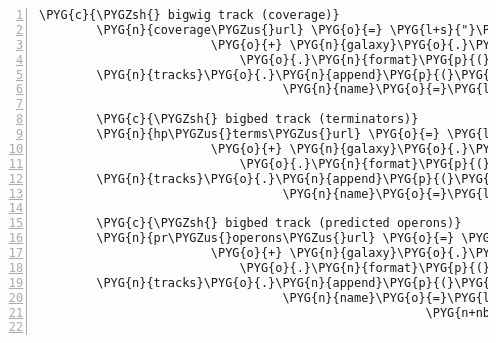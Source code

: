\begin{Verbatim}[commandchars=\\\{\},numbers=left,firstnumber=1,stepnumber=5]
        \PYG{c}{\PYGZsh{} bigwig track (coverage)}
        \PYG{n}{coverage\PYGZus{}url} \PYG{o}{=} \PYG{l+s}{"}\PYG{l+s}{https://}\PYG{l+s}{"} \PYG{o}{+} \PYG{n}{galaxy}\PYG{o}{.}\PYG{n}{hostname} \PYGZbs{}
                        \PYG{o}{+} \PYG{n}{galaxy}\PYG{o}{.}\PYG{n}{dataset\PYGZus{}display\PYGZus{}url\PYGZus{}template} \PYGZbs{}
                            \PYG{o}{.}\PYG{n}{format}\PYG{p}{(}\PYG{n}{dataset}\PYG{o}{=}\PYG{n+nb+bp}{self}\PYG{o}{.}\PYG{n}{analysis}\PYG{o}{.}\PYG{n}{galaxy\PYGZus{}coverage}\PYG{o}{.}\PYG{n}{id}\PYG{p}{)}
        \PYG{n}{tracks}\PYG{o}{.}\PYG{n}{append}\PYG{p}{(}\PYG{n}{BigWigTrack}\PYG{p}{(}\PYG{n}{url}\PYG{o}{=}\PYG{n}{coverage\PYGZus{}url}\PYG{p}{,}
                                  \PYG{n}{name}\PYG{o}{=}\PYG{l+s}{"}\PYG{l+s}{RNA-Seqlyze \textbar{} }\PYG{l+s+si}{\PYGZpc{}s}\PYG{l+s}{"} \PYG{o}{\PYGZpc{}} \PYG{n+nb+bp}{self}\PYG{o}{.}\PYG{n}{coverage\PYGZus{}name}\PYG{p}{)}\PYG{p}{)}

        \PYG{c}{\PYGZsh{} bigbed track (terminators)}
        \PYG{n}{hp\PYGZus{}terms\PYGZus{}url} \PYG{o}{=} \PYG{l+s}{"}\PYG{l+s}{https://}\PYG{l+s}{"} \PYG{o}{+} \PYG{n}{galaxy}\PYG{o}{.}\PYG{n}{hostname} \PYGZbs{}
                        \PYG{o}{+} \PYG{n}{galaxy}\PYG{o}{.}\PYG{n}{dataset\PYGZus{}display\PYGZus{}url\PYGZus{}template} \PYGZbs{}
                            \PYG{o}{.}\PYG{n}{format}\PYG{p}{(}\PYG{n}{dataset}\PYG{o}{=}\PYG{n+nb+bp}{self}\PYG{o}{.}\PYG{n}{analysis}\PYG{o}{.}\PYG{n}{galaxy\PYGZus{}hp\PYGZus{}terms}\PYG{o}{.}\PYG{n}{id}\PYG{p}{)}
        \PYG{n}{tracks}\PYG{o}{.}\PYG{n}{append}\PYG{p}{(}\PYG{n}{BigBedTrack}\PYG{p}{(}\PYG{n}{url}\PYG{o}{=}\PYG{n}{hp\PYGZus{}terms\PYGZus{}url}\PYG{p}{,}
                                  \PYG{n}{name}\PYG{o}{=}\PYG{l+s}{"}\PYG{l+s}{RNA-Seqlyze \textbar{} }\PYG{l+s+si}{\PYGZpc{}s}\PYG{l+s}{"} \PYG{o}{\PYGZpc{}} \PYG{n+nb+bp}{self}\PYG{o}{.}\PYG{n}{hp\PYGZus{}terms\PYGZus{}name}\PYG{p}{)}\PYG{p}{)}

        \PYG{c}{\PYGZsh{} bigbed track (predicted operons)}
        \PYG{n}{pr\PYGZus{}operons\PYGZus{}url} \PYG{o}{=} \PYG{l+s}{"}\PYG{l+s}{https://}\PYG{l+s}{"} \PYG{o}{+} \PYG{n}{galaxy}\PYG{o}{.}\PYG{n}{hostname} \PYGZbs{}
                        \PYG{o}{+} \PYG{n}{galaxy}\PYG{o}{.}\PYG{n}{dataset\PYGZus{}display\PYGZus{}url\PYGZus{}template} \PYGZbs{}
                            \PYG{o}{.}\PYG{n}{format}\PYG{p}{(}\PYG{n}{dataset}\PYG{o}{=}\PYG{n+nb+bp}{self}\PYG{o}{.}\PYG{n}{analysis}\PYG{o}{.}\PYG{n}{galaxy\PYGZus{}pr\PYGZus{}operons}\PYG{o}{.}\PYG{n}{id}\PYG{p}{)}
        \PYG{n}{tracks}\PYG{o}{.}\PYG{n}{append}\PYG{p}{(}\PYG{n}{BigBedTrack}\PYG{p}{(}\PYG{n}{url}\PYG{o}{=}\PYG{n}{pr\PYGZus{}operons\PYGZus{}url}\PYG{p}{,}
                                  \PYG{n}{name}\PYG{o}{=}\PYG{l+s}{"}\PYG{l+s}{RNA-Seqlyze \textbar{} }\PYG{l+s+si}{\PYGZpc{}s}\PYG{l+s}{"} \PYG{o}{\PYGZpc{}}
                                                      \PYG{n+nb+bp}{self}\PYG{o}{.}\PYG{n}{pr\PYGZus{}operons\PYGZus{}name}\PYG{p}{)}\PYG{p}{)}


\end{Verbatim}
